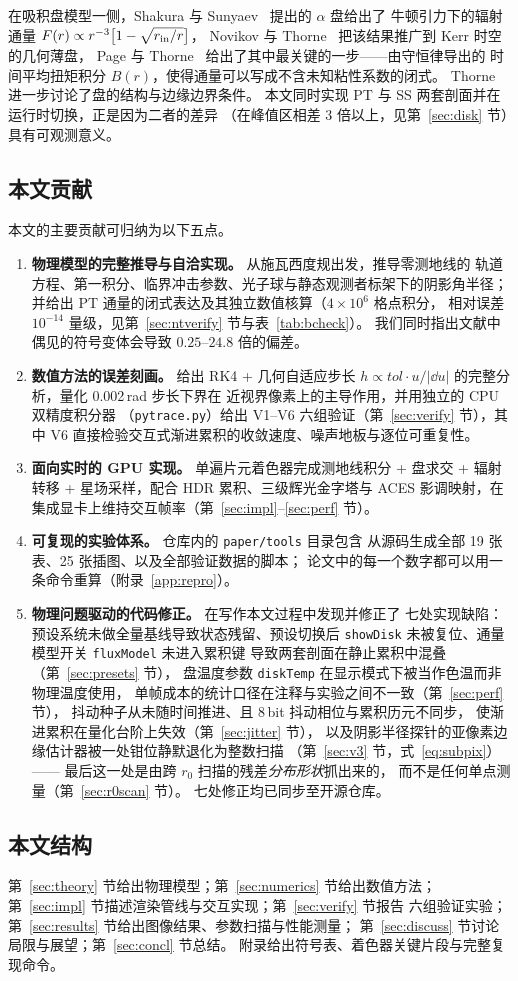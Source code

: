 在吸积盘模型一侧，Shakura 与 Sunyaev~\cite{ss1973} 提出的 $\alpha$ 盘给出了
牛顿引力下的辐射通量 $F(r)\propto r^{-3}\bigl[1-\sqrt{r_{\mathrm{in}}/r}\bigr]$，
Novikov 与 Thorne~\cite{nt1973} 把该结果推广到 Kerr 时空的几何薄盘，
Page 与 Thorne~\cite{pt1974} 给出了其中最关键的一步——由守恒律导出的
时间平均扭矩积分 $B(r)$，使得通量可以写成不含未知粘性系数的闭式。
Thorne~\cite{thorne1974} 进一步讨论了盘的结构与边缘边界条件。
本文同时实现 PT 与 SS 两套剖面并在运行时切换，正是因为二者的差异
（在峰值区相差 $3$ 倍以上，见第~\ref{sec:disk} 节）具有可观测意义。

\subsection{本文贡献}

本文的主要贡献可归纳为以下五点。

\begin{enumerate}[leftmargin=1.6em,itemsep=2pt]
\item \textbf{物理模型的完整推导与自洽实现。} 从施瓦西度规出发，推导零测地线的
轨道方程、第一积分、临界冲击参数、光子球与静态观测者标架下的阴影角半径；
并给出 PT 通量的闭式表达及其独立数值核算（$4\times10^{6}$ 格点积分，
相对误差 $10^{-14}$ 量级，见第~\ref{sec:ntverify} 节与表~\ref{tab:bcheck}）。
我们同时指出文献中偶见的符号变体会导致 $0.25$--$24.8$ 倍的偏差。
\item \textbf{数值方法的误差刻画。} 给出 RK4 + 几何自适应步长
$h\propto tol\cdot u/|\dd u|$ 的完整分析，量化 0.002\,rad 步长下界在
近视界像素上的主导作用，并用独立的 CPU 双精度积分器
（\texttt{pytrace.py}）给出 V1--V6 六组验证（第~\ref{sec:verify} 节），其中
V6 直接检验交互式渐进累积的收敛速度、噪声地板与逐位可重复性。
\item \textbf{面向实时的 GPU 实现。} 单遍片元着色器完成测地线积分 +
盘求交 + 辐射转移 + 星场采样，配合 HDR 累积、三级辉光金字塔与 ACES
影调映射，在集成显卡上维持交互帧率（第~\ref{sec:impl}--\ref{sec:perf} 节）。
\item \textbf{可复现的实验体系。} 仓库内的 \texttt{paper/tools} 目录包含
从源码生成全部 19 张表、25 张插图、以及全部验证数据的脚本；
论文中的每一个数字都可以用一条命令重算（附录~\ref{app:repro}）。
\item \textbf{物理问题驱动的代码修正。} 在写作本文过程中发现并修正了
七处实现缺陷：预设系统未做全量基线导致状态残留、预设切换后
\texttt{showDisk} 未被复位、通量模型开关 \texttt{fluxModel} 未进入累积键
导致两套剖面在静止累积中混叠（第~\ref{sec:presets} 节），
盘温度参数 \texttt{diskTemp} 在显示模式下被当作色温而非物理温度使用，
单帧成本的统计口径在注释与实验之间不一致（第~\ref{sec:perf} 节），
抖动种子从未随时间推进、且 8\,bit 抖动相位与累积历元不同步，
使渐进累积在量化台阶上失效（第~\ref{sec:jitter} 节），
以及阴影半径探针的亚像素边缘估计器被一处钳位静默退化为整数扫描
（第~\ref{sec:v3} 节，式~\eqref{eq:subpix}）——
最后这一处是由跨 $r_0$ 扫描的残差\emph{分布形状}抓出来的，
而不是任何单点测量（第~\ref{sec:r0scan} 节）。
七处修正均已同步至开源仓库。
\end{enumerate}

\subsection{本文结构}

第~\ref{sec:theory} 节给出物理模型；第~\ref{sec:numerics} 节给出数值方法；
第~\ref{sec:impl} 节描述渲染管线与交互实现；第~\ref{sec:verify} 节报告
六组验证实验；第~\ref{sec:results} 节给出图像结果、参数扫描与性能测量；
第~\ref{sec:discuss} 节讨论局限与展望；第~\ref{sec:concl} 节总结。
附录给出符号表、着色器关键片段与完整复现命令。
